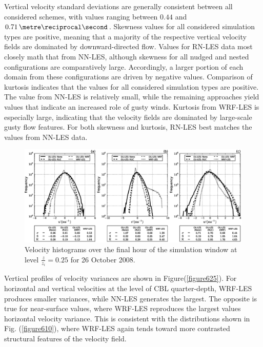 Vertical velocity standard deviations are generally consistent between all considered schemes, with values ranging between $0.44$ and $0.71\, \metre\reciprocal\second$. Skewness values for all considered simulation types are positive, meaning that a majority of the respective vertical velocity fields are dominated by downward-directed flow. Values for RN-LES data most closely math that from NN-LES, although skewness for all nudged and nested configurations are comparatively large. Accordingly, a larger portion of each domain from these configurations are driven by negative values. Comparison of kurtosis indicates that the values for all considered simulation types are positive. The value from NN-LES is relatively small, while the remaining approaches yield values that indicate an increased role of gusty winds. Kurtosis from WRF-LES is especially large, indicating that the velocity fields are dominated by large-scale gusty flow features. For both skewness and kurtosis, RN-LES best matches the values from NN-LES data.


\begin{figure}
\begin{center}
\includegraphics[width=\textheight]{figures/chapter6/velocity_distribution_20081026}
\end{center}
\caption{Velocity histograms over the final hour of the simulation window at level $\frac{z}{z_i}=0.25$ for 26 October 2008.}
\label{figure624}
\end{figure}


\newpage

Vertical profiles of velocity variances are shown in Figure(\autoref{figure625}). For horizontal and vertical velocities at the level of CBL quarter-depth, WRF-LES produces smaller variances, while NN-LES generates the largest. The opposite is true for near-surface values, where WRF-LES reproduces the largest values horizontal velocity variance. This is consistent with the distributions shown in Fig. (\autoref{figure610}), where WRF-LES again tends toward more contrasted structural features of the velocity field. 


